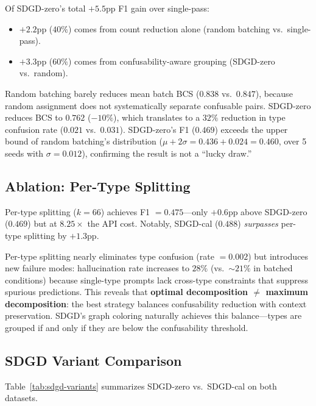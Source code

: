 \documentclass[11pt,a4paper]{article}
\begin{document}
Of SDGD-zero's total $+5.5$pp F1 gain over single-pass:
\begin{itemize}
\item $+2.2$pp ($40\%$) comes from count reduction alone (random batching vs.\ single-pass).
\item $+3.3$pp ($60\%$) comes from confusability-aware grouping (SDGD-zero vs.\ random).
\end{itemize}

Random batching barely reduces mean batch BCS ($0.838$ vs.\ $0.847$), because random assignment does not systematically separate confusable pairs.
SDGD-zero reduces BCS to $0.762$ ($-10\%$), which translates to a $32\%$ reduction in type confusion rate ($0.021$ vs.\ $0.031$).
SDGD-zero's F1 ($0.469$) exceeds the upper bound of random batching's distribution ($\mu + 2\sigma = 0.436 + 0.024 = 0.460$, over 5 seeds with $\sigma{=}0.012$), confirming the result is not a ``lucky draw.''


\subsection{Ablation: Per-Type Splitting}
\label{sec:ablation-pertype}

Per-type splitting ($k{=}66$) achieves F1 $= 0.475$---only $+0.6$pp above SDGD-zero ($0.469$) but at $8.25\times$ the API cost.
Notably, SDGD-cal ($0.488$) \emph{surpasses} per-type splitting by $+1.3$pp.

Per-type splitting nearly eliminates type confusion (rate $= 0.002$) but introduces new failure modes:
hallucination rate increases to $28\%$ (vs.\ $\sim\!21\%$ in batched conditions) because single-type prompts lack cross-type constraints that suppress spurious predictions.
This reveals that \textbf{optimal decomposition $\neq$ maximum decomposition}: the best strategy balances confusability reduction with context preservation.
SDGD's graph coloring naturally achieves this balance---types are grouped if and only if they are below the confusability threshold.


\subsection{SDGD Variant Comparison}
\label{sec:sdgd-variants}

Table~\ref{tab:sdgd-variants} summarizes SDGD-zero vs.\ SDGD-cal on both datasets.
\end{document}
